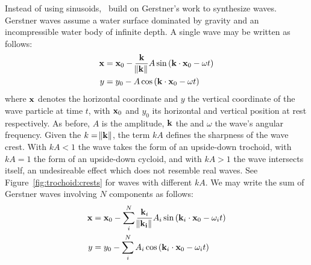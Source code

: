 Instead of using sinusoids,~\cite{Fournier:1986} build on Gerstner's work
\citep{Gerstner:1809, Rankine:1863} to synthesize waves. Gerstner waves assume
a water surface dominated by gravity and an incompressible water body of
infinite depth. A single wave may be written as follows:
\begin{align}
\mathbf{x} &= \mathbf{x}_0 - \frac{\mathbf{k}}{\norm{\mathbf{k}}} A \sin\left(\mathbf{k}\cdot\mathbf{x}_0-\omega t\right)\\
y &= y_0 - A \cos\left(\mathbf{k}\cdot\mathbf{x}_0-\omega t\right)
\end{align}
where $\mathbf{x}$ denotes the horizontal coordinate and $y$ the vertical coordinate
of the wave particle at time $t$, with $\mathbf{x}_0$ and $y_0$ its horizontal
and vertical position at rest respectively. As before, $A$ is the amplitude,
$\mathbf{k}$ the \wavevector and $\omega$ the wave's angular frequency. Given the
\wavenumber $k=\norm{\mathbf{k}}$, the term $kA$ defines the sharpness of the wave
crest. With $kA<1$ the wave takes the form of an upside-down trochoid, with
$kA=1$ the form of an upside-down cycloid, and with $kA>1$ the wave intersects
itself, an undesireable effect which does not resemble real waves.
See Figure~\ref{fig:trochoid:crests} for waves with different $kA$.
We may write the sum of Gerstner waves involving $N$ components as follows:
\begin{align}
\mathbf{x} &= \mathbf{x}_0 - \sum_i^N\frac{\mathbf{k}_i}{\norm{\mathbf{k_i}}} A_i \sin\left(\mathbf{k}_i\cdot\mathbf{x}_0-\omega_i t\right)\\
y &= y_0 - \sum_i^N A_i \cos\left(\mathbf{k}_i\cdot\mathbf{x}_0-\omega_i t\right)
\end{align}
%

